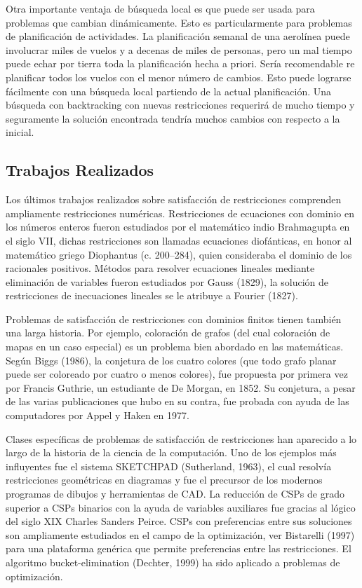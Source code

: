 Otra importante ventaja de b\'usqueda local es que puede ser usada para problemas que cambian din\'amicamente. Esto es particularmente para problemas de planificaci\'on de actividades. La planificaci\'on semanal de una aerol\'inea puede involucrar miles de vuelos y a decenas de miles de personas, pero un mal tiempo puede echar por tierra toda la planificaci\'on hecha a priori. Ser\'ia recomendable re planificar todos los vuelos con el menor n\'umero de cambios. Esto puede lograrse f\'acilmente con una b\'usqueda local partiendo de la actual planificaci\'on. Una b\'usqueda con backtracking con nuevas restricciones requerir\'a de mucho tiempo y seguramente la soluci\'on encontrada tendr\'ia muchos cambios con respecto a la inicial.

\subsection{Trabajos Realizados}

Los \'ultimos trabajos realizados sobre satisfacci\'on de restricciones comprenden ampliamente restricciones num\'ericas. Restricciones de ecuaciones con dominio en los n\'umeros enteros fueron estudiados por el matem\'atico indio Brahmagupta en el siglo VII, dichas restricciones son llamadas ecuaciones diofánticas, en honor al matem\'atico griego Diophantus (c. 200–284), quien consideraba el dominio de los racionales positivos. M\'etodos para resolver ecuaciones lineales  mediante eliminaci\'on de variables fueron estudiados por Gauss (1829), la soluci\'on de restricciones de inecuaciones lineales se le atribuye a Fourier (1827).

Problemas de satisfacci\'on de restricciones con dominios finitos tienen tambi\'en una larga historia. Por ejemplo, coloraci\'on de grafos (del cual coloraci\'on de mapas en un caso especial) es un problema bien abordado en las matem\'aticas. Seg\'un Biggs (1986), la conjetura de los cuatro colores (que todo grafo planar puede ser coloreado por cuatro o menos colores), fue propuesta por primera vez por Francis Guthrie, un estudiante de De Morgan, en 1852. Su conjetura, a pesar de las varias publicaciones que hubo en su contra, fue probada con ayuda de las computadores por Appel y Haken en 1977.

Clases espec\'ificas de problemas de satisfacci\'on de restricciones han aparecido a lo largo de la historia de la ciencia de la computaci\'on. Uno de los ejemplos m\'as influyentes fue el sistema SKETCHPAD (Sutherland, 1963), el cual resolv\'ia restricciones geom\'etricas en diagramas y fue el precursor de los modernos programas de dibujos y herramientas de CAD. La reducci\'on de CSPs de grado superior a CSPs binarios con la ayuda de variables auxiliares fue gracias al l\'ogico del siglo XIX Charles Sanders Peirce. CSPs con preferencias entre sus soluciones son ampliamente estudiados en el campo de la optimizaci\'on, ver Bistarelli (1997) para una plataforma gen\'erica que permite preferencias entre las restricciones. El algoritmo bucket-elimination (Dechter, 1999) ha sido aplicado a problemas de optimizaci\'on.

